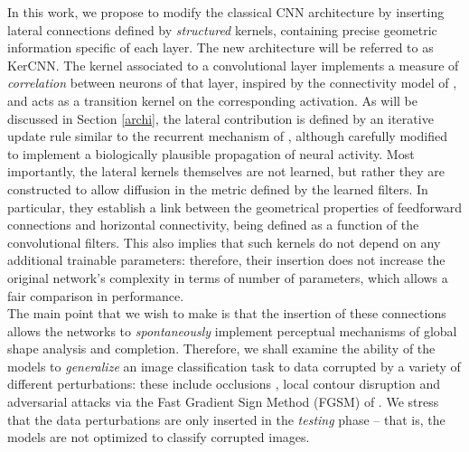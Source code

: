 \documentclass[11pt,oneside,reqno]{amsart}
\begin{document}
  In this work, we propose to modify the classical CNN architecture by inserting lateral connections defined by \emph{structured} kernels, containing precise geometric information specific of each layer. The new architecture will be referred to as KerCNN. The kernel associated to a convolutional layer implements a measure of \emph{correlation} between neurons of that layer, inspired by the connectivity model of \citet{neuro,metric}, and acts as a transition kernel on the corresponding activation. As will be discussed in Section \ref{archi}, the lateral contribution is defined by an iterative update rule similar to the recurrent mechanism of \citet{liang}, although carefully modified to implement a biologically plausible propagation of neural activity. Most importantly, the lateral kernels themselves are not learned, but rather they are constructed to allow diffusion in the metric defined by the learned filters. In particular, they establish a link between the geometrical properties of feedforward connections and horizontal connectivity, being defined as a function of the convolutional filters. This also implies that such kernels do not depend on any additional trainable parameters: therefore, their insertion does not increase the original network's complexity in terms of number of parameters, which allows a fair comparison in performance.\\
  The main point that we wish to make is that the insertion of these connections allows the networks to \emph{spontaneously} implement perceptual mechanisms of global shape analysis and completion. Therefore, we shall examine the ability of the models to \emph{generalize} an image classification task to data corrupted by a variety of different perturbations: these include occlusions \citep[as in][]{tang}, local contour disruption \citep[as in][]{baker} and adversarial attacks via the Fast Gradient Sign Method (FGSM) of \citet{fgsm}. We stress that the data perturbations are only inserted in the \emph{testing} phase -- that is, the models are not optimized to classify corrupted images.\\
\end{document}

